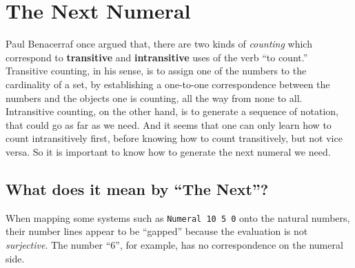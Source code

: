\documentclass[\main/thesis.tex]{subfiles}
\begin{document}
\section{The Next Numeral}\label{next}

Paul Benacerraf once argued\cite{benacerraf1965numbers} that,
there are two kinds of \textit{counting} which correspond to \textbf{transitive}
and \textbf{intransitive} uses of the verb ``to count.''
Transitive counting, in his sense, is to assign one of the numbers to the
cardinality of a set,
by establishing a one-to-one correspondence between the numbers and the objects
one is counting, all the way from none to all.
Intransitive counting, on the other hand, is to generate a sequence of notation,
that could go as far as we need.
And it seems that one can only learn how to count intransitively first,
before knowing how to count transitively, but not vice versa.
So it is important to know how to generate the next numeral we need.

\subsection{What does it mean by ``The Next''?}

When mapping some systems such as {\lstinline|Numeral 10 5 0|} onto the natural
numbers, their number lines appear to be ``gapped'' because the evaluation is
not \textit{surjective}.
The number ``6'', for example, has no correspondence on the numeral side.

\begin{center}
    \begin{adjustbox}{max width=\textwidth}
    \end{adjustbox}
\end{center}
\end{document}
